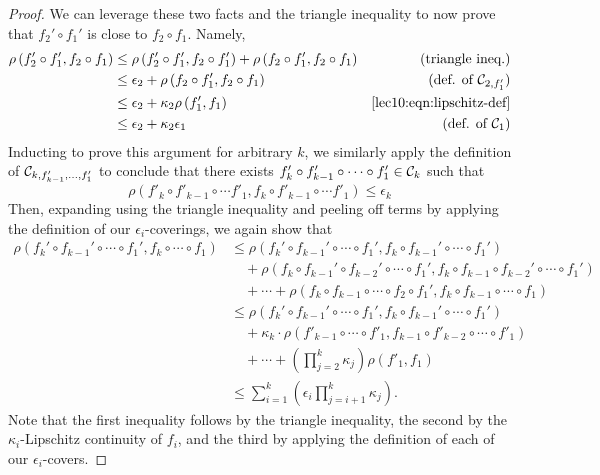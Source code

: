 \begin{proof}
	We can leverage these two facts and the triangle inequality to now prove that $f_2' \circ f_1'$ is close to $f_2 \circ f_1$. Namely,
	\begin{align}
	\rho\left(f_2' \circ f_1', f_2 \circ f_1\right) &\leq \rho\left(f_2' \circ f_1', f_2 \circ f_1'\right) + \rho\left(f_2 \circ f_1', f_2 \circ f_1\right) &\text{(triangle ineq.)} \\ 
	&\leq \epsilon_2 + \rho\left(f_2 \circ f_1', f_2 \circ f_1\right) &\text{(def. of $\mathcal C_{2, f'_1}$)}\\ 
	&\leq \epsilon_2 + \kappa_2 \rho\left(f_1', f_1\right) &\text{\eqref{lec10:eqn:lipschitz-def}}\\ 
	&\leq \epsilon_2 + \kappa_2\epsilon_1 &\text{(def. of $\mathcal C_{1}$)}
	\end{align}
	Inducting to prove this argument for arbitrary $k$, we similarly apply the definition of $\mathcal C_{k, f'_{k - 1},\dots,f'_1}$ to conclude that there exists $f'_{k} \circ f'_{k - 1} \circ \cdots \circ f'_1 \in \mathcal C_k$ such that
	\begin{equation}
	\rho(f'_k \circ f'_{k - 1} \circ \cdots f'_1, f_k \circ f'_{k - 1} \circ \cdots f'_1) \leq \epsilon_k
	\end{equation}
	Then, expanding using the triangle inequality and peeling off terms by applying the definition of our $\epsilon_i$-coverings, we again show that
	\begin{align}
	\rho\left(f_k' \circ f_{k-1}' \circ \cdots \circ f_1', f_k \circ \cdots \circ f_1\right) &\leq \rho\left(f_k' \circ f_{k-1}'\circ \cdots \circ f_1', f_k \circ f_{k-1}'\circ \cdots \circ f_1' \right) \\ 
	&\quad + \rho\left(f_k \circ f_{k-1}'\circ f_{k-2}' \circ \cdots \circ f_1', f_k \circ f_{k-1}\circ f_{k-2}' \circ \cdots \circ f_1'\right) \nonumber \\ 
	&\quad + \cdots + \rho\left(f_k \circ f_{k-1}\circ \cdots \circ f_2 \circ f_1', f_k \circ f_{k-1}\circ \cdots \circ f_1\right) \nonumber \\ 
	&\leq \rho\left(f_k' \circ f_{k-1}'\circ \cdots \circ f_1', f_k \circ f_{k-1}'\circ \cdots \circ f_1' \right) \\
	&\quad + \kappa_{k} \cdot \rho(f'_{k - 1} \circ \cdots \circ f'_1, f_{k - 1} \circ f'_{k - 2} \circ \cdots \circ f'_1) \\
	&\quad + \cdots + \left(\prod_{j = 2}^k \kappa_j\right) \rho(f'_1, f_1) \nonumber  \\
	& \leq \sum_{i=1}^{k} \left(\epsilon_i\prod_{j=i+1}^{k}\kappa_{j}\right).
	\end{align}
	Note that the first inequality follows by the triangle inequality, the second by the $\kappa_i$-Lipschitz continuity of $f_i$, and the third by applying the definition of each of our $\epsilon_i$-covers.
\end{proof}

